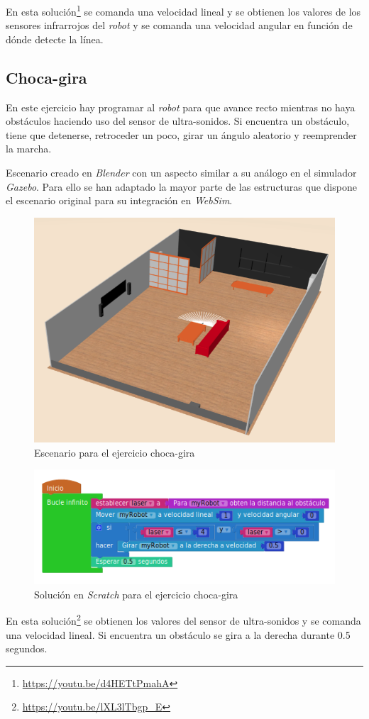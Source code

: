     En esta solución\footnote{\url{https://youtu.be/d4HETtPmahA}} se comanda una velocidad lineal y se obtienen los valores de los sensores infrarrojos del \textit{robot} y se comanda una velocidad angular en función de dónde detecte la línea.
    
\subsection{Choca-gira}
\label{subsec:chocagira}
En este ejercicio hay programar al \textit{robot} para que avance recto mientras no haya obstáculos haciendo uso del sensor de ultra-sonidos. Si encuentra un obstáculo, tiene que detenerse, retroceder un poco, girar un ángulo aleatorio y reemprender la marcha.

Escenario creado en \textit{Blender} con un aspecto similar a su análogo en el simulador \textit{Gazebo}. Para ello se han adaptado la mayor parte de las estructuras que dispone el escenario original para su integración en \textit{WebSim}. 

    \begin{figure}[H]
    \centering
    \includegraphics[scale=0.5]{img/bump&go.png}
    \caption{Escenario para el ejercicio choca-gira} \label{fig:chocagira}
    \end{figure}
    \begin{figure}[H]
    \centering
    \includegraphics[scale=0.75]{img/chocagiracodigo.png}
    \caption{Solución en \textit{Scratch} para el ejercicio choca-gira} 
    \label{fig:chocagiraSolution}
    \end{figure}
    En esta solución\footnote{\url{https://youtu.be/lXL3lTbgp_E}} se obtienen los valores del sensor de ultra-sonidos y se comanda una velocidad lineal. Si encuentra un obstáculo se gira a la derecha durante 0.5 segundos.
    
